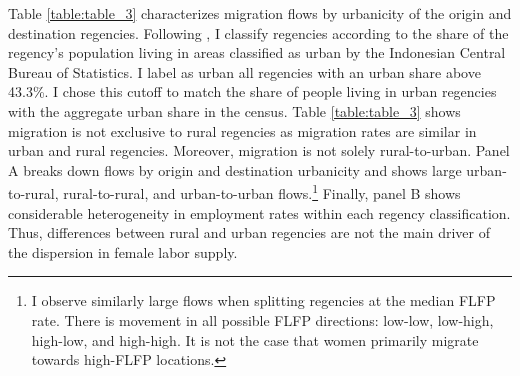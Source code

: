 Table \ref{table:table_3} characterizes migration flows by urbanicity of the origin and destination regencies. Following \cite{Bryan2019},  I classify regencies according to the share of the regency's population living in areas classified as urban by the Indonesian Central Bureau of Statistics. I label as urban all regencies with an urban share above 43.3\%. 
I chose this cutoff to match the share of people living in urban regencies with the aggregate urban share in the census. Table \ref{table:table_3} shows migration is not exclusive to rural regencies as migration rates are similar in urban and rural regencies. Moreover, migration is not solely rural-to-urban. Panel A breaks down flows by origin and destination urbanicity and shows large urban-to-rural, rural-to-rural, and urban-to-urban flows.\footnote{I observe similarly large flows when splitting regencies at the median FLFP rate. There is movement in all possible FLFP directions: low-low, low-high, high-low, and high-high. It is not the case that women primarily migrate towards high-FLFP locations.} Finally, panel B shows considerable heterogeneity in employment rates within each regency classification. Thus, differences between rural and urban regencies are not the main driver of the dispersion in female labor supply.






